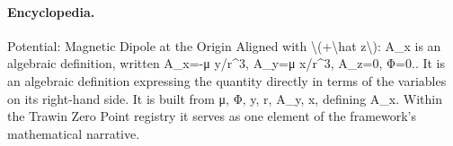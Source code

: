 \paragraph{Encyclopedia.}
Potential: Magnetic Dipole at the Origin Aligned with \textbackslash{}(+\textbackslash{}hat z\textbackslash{}): A\_x is an algebraic definition, written A\_x=-μ y/r\textasciicircum{}3, A\_y=μ x/r\textasciicircum{}3, A\_z=0, Φ=0.. It is an algebraic definition expressing the quantity directly in terms of the variables on its right-hand side. It is built from μ, Φ, y, r, A\_y, x, defining A\_x. Within the Trawin Zero Point registry it serves as one element of the framework's mathematical narrative.
